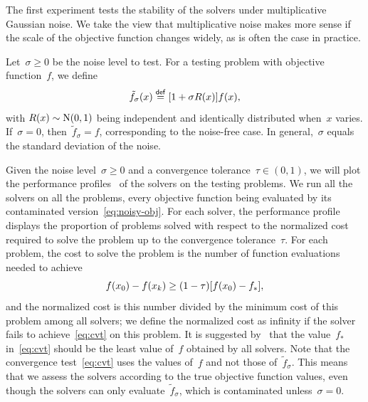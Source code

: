 \documentclass[
    smallextended,  %
    final,          %
]{svjour3}
\newcommand{\NN}{\mathrm{N}}
\newcommand{\eqdef}{\mathrel{\stackrel{\mathsf{def}}{=}}}
\newcommand{\iter}[1][k]{x\ifthenelse{\equal{#1}{}}{}{_{#1}}}
\newcommand{\obj}{f}
\begin{document}

The first experiment tests the stability of the solvers under multiplicative Gaussian noise.
We take the view that multiplicative noise makes more sense if the scale of the objective
function changes widely, as is often the case in practice.

Let~$\sigma \ge 0$ be the noise level to test.
For a testing problem with objective function~$\obj$, we define
\begin{equation}
    \label{eq:noisy-obj}
    \tilde{\obj}_\sigma(\iter[]) \eqdef [1 + \sigma R(\iter[])] \obj(\iter[]),
\end{equation}
with $R(\iter[])\sim \NN(0, 1)$ being independent and identically distributed when~$x$ varies.
If~$\sigma = 0$, then~$\tilde{f}_\sigma = f$, corresponding to the noise-free case.
In general,~$\sigma$ equals the standard deviation of the noise.

Given the noise level~$\sigma\ge 0$ and a convergence tolerance~$\tau\in(0,1)$, we will plot the
performance profiles~\cite{Dolan_More_2002,More_Wild_2009} of the solvers on the testing problems.
We run all the solvers on all the problems, every objective function being evaluated by its
contaminated version~\eqref{eq:noisy-obj}.
For each solver, the performance profile displays the proportion of problems solved with respect to the
normalized cost required to solve the problem up to the convergence tolerance~$\tau$.
For each problem, the cost to solve the problem is the number of function evaluations needed to achieve
\begin{equation}
    \label{eq:cvt}
    \obj(\iter[0]) - \obj(\iter) \ge (1 - \tau) [\obj(\iter[0]) - \obj_{\ast}],
\end{equation}
and the normalized cost is this number divided by the minimum cost of this problem among all solvers;
we define the normalized cost as infinity if the solver fails to achieve~\eqref{eq:cvt} on this problem.
It is suggested by~\cite[\S~2.1]{More_Wild_2009} that the value~$\obj_{\ast}$ in~\eqref{eq:cvt} should be
the least value of~$\obj$ obtained by all solvers.
Note that the convergence test~\eqref{eq:cvt} uses the values of~$\obj$ and not
those of~$\tilde{\obj}_\sigma$.
This means that we assess the solvers according to the true objective function values, even though the
solvers can only evaluate~$\tilde{\obj}_\sigma$, which is contaminated unless~$\sigma = 0$.
\end{document}
